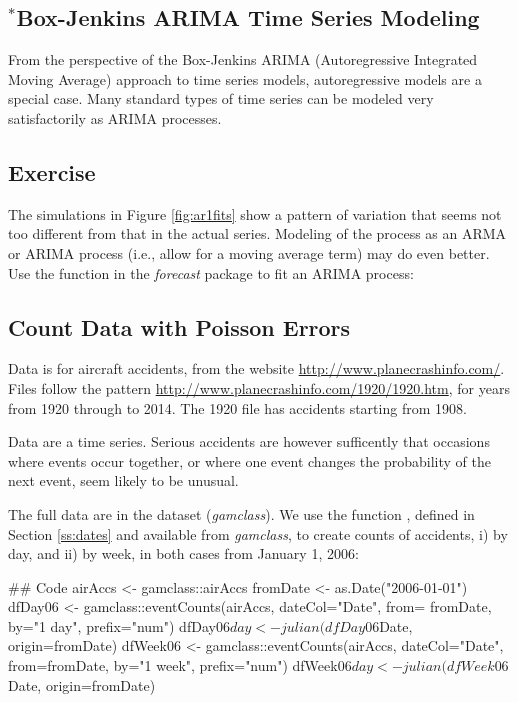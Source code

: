 \subsection{$^*$Box-Jenkins ARIMA Time Series Modeling}

From the perspective of the Box-Jenkins ARIMA (Autoregressive
Integrated Moving Average) approach to time series models,
autoregressive models are a special case.  Many standard types of time
series can be modeled very satisfactorily as ARIMA processes.

\subsection*{Exercise}
The simulations in Figure \ref{fig:ar1fits} show a pattern of
  variation that seems not too different from that in the actual series.
  Modeling of the process as an ARMA or ARIMA process (i.e., allow
  for a moving average term) may do even better.  Use the
   function in the {\em forecast} package to fit an
  ARIMA process:

\subsection{Count Data with Poisson Errors}

Data is for aircraft accidents, from the website
\url{http://www.planecrashinfo.com/}.  Files follow the pattern
\url{http://www.planecrashinfo.com/1920/1920.htm},
for years from 1920 through to 2014.  The 1920 file has
accidents starting from 1908.

Data are a time series.  Serious accidents are however sufficently
that occasions where events occur together, or where one event
changes the probability of the next event, seem likely to be
unusual.

The full data are in the dataset  ({\em gamclass}).
We use the function , defined in Section
\ref{ss:dates} and available from {\em gamclass}, to create counts of
accidents, i) by day, and ii) by week, in both cases from January 1,
2006:

\begin{fullwidth}

\begin{Schunk}
\begin{Sinput}
## Code
airAccs <- gamclass::airAccs
fromDate <- as.Date("2006-01-01")
dfDay06 <- gamclass::eventCounts(airAccs, dateCol="Date", from= fromDate,
                                 by="1 day", prefix="num")
dfDay06$day <- julian(dfDay06$Date, origin=fromDate)
dfWeek06 <- gamclass::eventCounts(airAccs, dateCol="Date", from=fromDate,
                                  by="1 week", prefix="num")
dfWeek06$day <- julian(dfWeek06$Date, origin=fromDate)
\end{Sinput}
\end{Schunk}

\end{fullwidth}

